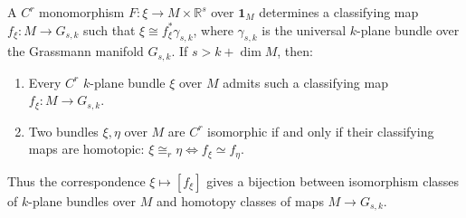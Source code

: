A $C^r$ monomorphism $F: \xi \to M \times \mathbb{R}^s$ over $\mathbf{1}_M$ determines a classifying map $f_\xi: M \to G_{s,k}$ such that $\xi \cong f_\xi^* \gamma_{s,k}$, where $\gamma_{s,k}$ is the universal $k$-plane bundle over the Grassmann manifold $G_{s,k}$. If $s > k + \dim M$, then:
\begin{enumerate}
\item Every $C^r$ $k$-plane bundle $\xi$ over $M$ admits such a classifying map $f_\xi: M \to G_{s,k}$.
\item Two bundles $\xi, \eta$ over $M$ are $C^r$ isomorphic if and only if their classifying maps are homotopic: $\xi \cong_r \eta \iff f_\xi \simeq f_\eta$.
\end{enumerate}
Thus the correspondence $\xi \mapsto [f_\xi]$ gives a bijection between isomorphism classes of $k$-plane bundles over $M$ and homotopy classes of maps $M \to G_{s,k}$.
